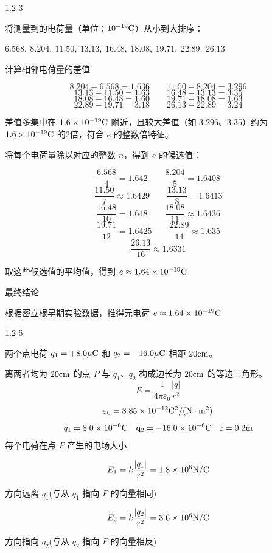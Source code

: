 \documentclass{article}
\begin{document}
1.2-3

将测量到的电荷量（单位：$ 10^{-19}\rm{C} $）从小到大排序：

$ 6.568,\ 8.204,\ 11.50,\ 13.13,\ 16.48,\ 18.08,\ 19.71,\ 22.89,\ 26.13 $

计算相邻电荷量的差值

$$8.204 - 6.568 = 1.636 \qquad11.50 - 8.204 = 3.296 $$
$$13.13 - 11.50 = 1.63 \qquad16.48 - 13.13 = 3.35 $$
$$18.08 - 16.48 = 1.60 \qquad19.71 - 18.08 = 1.63 $$
$$22.89 - 19.71 = 3.18 \qquad26.13 - 22.89 = 3.24 $$

差值多集中在 $ 1.6 \times 10^{-19}\rm{C} $ 附近，且较大差值（如 $ 3.296 $、$ 3.35 $）约为 $ 1.6 \times 10^{-19}\rm{C} $ 的2倍，符合 $ e $ 的整数倍特征。

将每个电荷量除以对应的整数 $ n $，得到 $ e $ 的候选值：

$$\frac{6.568}{4} = 1.642 \qquad\frac{8.204}{5} = 1.6408 $$
$$\frac{11.50}{7} \approx 1.6429 \qquad\frac{13.13}{8} = 1.6413 $$
$$\frac{16.48}{10} = 1.648 \qquad\frac{18.08}{11} \approx 1.6436 $$
$$\frac{19.71}{12} = 1.6425 \qquad\frac{22.89}{14} \approx 1.635 $$
$$\frac{26.13}{16} \approx 1.6331 $$


取这些候选值的平均值，得到 $ e \approx 1.64 \times 10^{-19}\rm{C} $

最终结论

根据密立根早期实验数据，推得元电荷 $ e \approx 1.64 \times 10^{-19}\rm{C} $


\newpage

1.2-5


两个点电荷 $q_1 = +8.0 \mu\rm{C}$ 和 $q_2 = -16.0 \mu\rm{C}$ 相距 $20 \rm{cm}$。

离两者均为 $20\rm{cm}$ 的点 $P$ 与 $q_1$、$q_2$ 构成边长为 $20 \rm{cm}$ 的等边三角形。
$$E = \frac{1}{4\pi\varepsilon_0}\frac{|q|}{r^2}$$
$$\varepsilon_0=8.85\times10^{-12}\rm{C}^2/(\rm{N}\cdot \rm{m}^2)$$
$$q_1 = 8.0 \times 10^{-6} \rm{C} \quad q_2 = -16.0 \times 10^{-6} \rm{C}\quad r = 0.2\rm{m}$$
每个电荷在点 $P$ 产生的电场大小:

$$E_1 = k \frac{|q_1|}{r^2} = 1.8 \times 10^6 \rm{N/C}$$

方向远离 $q_1$(与从 $q_1$ 指向 $P$ 的向量相同)

$$E_2 = k \frac{|q_2|}{r^2} = 3.6 \times 10^6 \rm{N/C}$$

方向指向 $q_2$(与从 $q_2$ 指向 $P$ 的向量相反)
\end{document}

